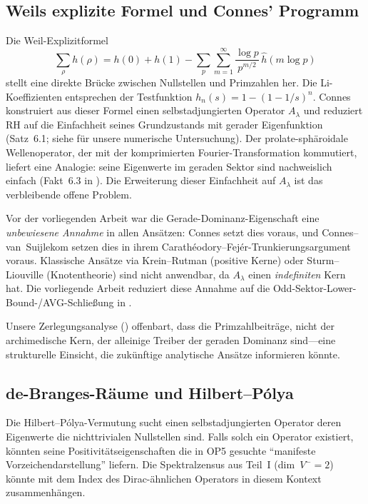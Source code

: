 ﻿\documentclass[12pt,a4paper]{article}
\theoremstyle{definition}
\theoremstyle{remark}
\begin{document}
\subsection{Weils explizite Formel und Connes' Programm}
Die Weil-Explizitformel
\[ \sum_\rho h(\rho) = h(0) + h(1) - \sum_p \sum_{m=1}^\infty \frac{\log p}{p^{m/2}}\,\hat{h}(m\log p) \]
stellt eine direkte Brücke zwischen Nullstellen und Primzahlen her. Die Li-Koeffizienten entsprechen der Testfunktion $h_n(s) = 1-(1-1/s)^n$. Connes \cite{Connes2026} konstruiert aus dieser Formel einen selbstadjungierten Operator $A_\lambda$ und reduziert RH auf die Einfachheit seines Grundzustands mit gerader Eigenfunktion (Satz~6.1; siehe  für unsere numerische Untersuchung). Der prolate-sphäroidale Wellenoperator, der mit der komprimierten Fourier-Transformation kommutiert, liefert eine Analogie: seine Eigenwerte im geraden Sektor sind nachweislich einfach (Fakt~6.3 in \cite{Connes2026}). Die Erweiterung dieser Einfachheit auf $A_\lambda$ ist das verbleibende offene Problem.

Vor der vorliegenden Arbeit war die Gerade-Dominanz-Eigenschaft eine \emph{unbewiesene Annahme} in allen Ansätzen: Connes \cite{Connes2026} setzt dies voraus, und Connes--van~Suijlekom \cite{ConnesvS2025} setzen dies in ihrem Carath\'eodory--Fej\'er-Trunkierungsargument voraus. Klassische Ansätze via Krein--Rutman (positive Kerne) oder Sturm--Liouville (Knotentheorie) sind nicht anwendbar, da $A_\lambda$ einen \emph{indefiniten} Kern hat. Die vorliegende Arbeit reduziert diese Annahme auf die Odd-Sektor-Lower-Bound-/AVG-Schließung in .

Unsere Zerlegungsanalyse () offenbart, dass die Primzahlbeiträge, nicht der archimedische Kern, der alleinige Treiber der geraden Dominanz sind---eine strukturelle Einsicht, die zukünftige analytische Ansätze informieren könnte.

\subsection{de-Branges-R\"aume und Hilbert--P\'olya}
Die Hilbert--Pólya-Vermutung sucht einen selbstadjungierten Operator deren Eigenwerte die nichttrivialen Nullstellen sind. Falls solch ein Operator existiert, könnten seine Positivitätseigenschaften die in OP5 gesuchte ``manifeste Vorzeichendarstellung'' liefern. Die Spektralzensus aus Teil~I (dim~$V^- = 2$) könnte mit dem Index des Dirac-ähnlichen Operators in diesem Kontext zusammenhängen.
\end{document}
